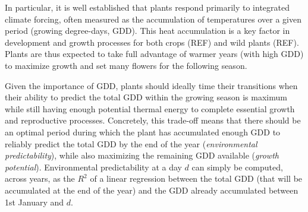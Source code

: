\documentclass[11pt,letter]{article}
\begin{document}
In particular, it is well established that plants respond primarily to integrated climate forcing, often measured as the accumulation of temperatures over a given period (growing degree-days, GDD). This heat accumulation is a key factor in development and growth processes for both crops (REF) and wild plants (REF). Plants are thus expected to take full advantage of warmer years (with high GDD) to maximize growth and set many flowers for the following season.

Given the importance of GDD, plants should ideally time their transitions when their ability to predict the total GDD within the growing season is maximum while still having enough potential thermal energy to complete essential growth and reproductive processes. Concretely, this trade-off means that there should be an optimal period during which the plant has accumulated enough GDD to reliably predict the total GDD by the end of the year (\emph{environmental predictability}), while also maximizing the remaining GDD available (\emph{growth potential}). Environmental predictability at a day $d$ can simply be computed, across years, as the $R^2$ of a linear regression between the total GDD (that will be accumulated at the end of the year) and the GDD already accumulated between 1st January and $d$.





\end{document}
